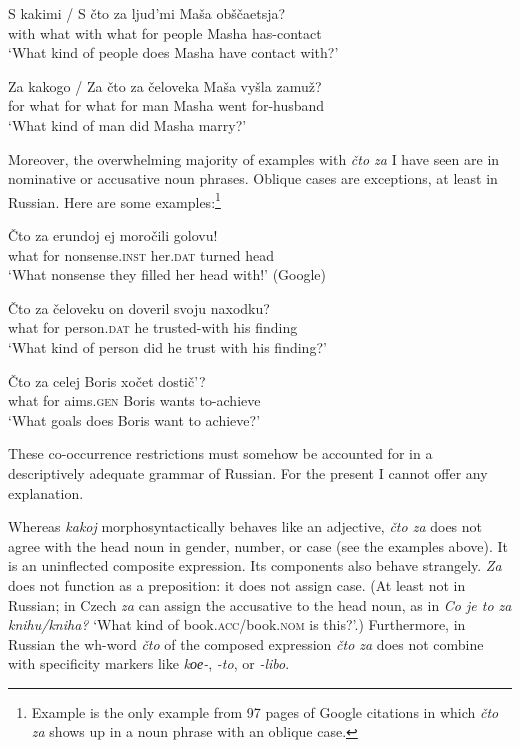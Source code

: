 \documentclass[output=paper,colorlinks,citecolor=brown]{langscibook}
\begin{document}
\ea \label{ex:zi08:10}
    \gll S kakimi / \minsp{*} S čto za ljud'mi {} Maša obščaetsja?\\
    with what {} {} with what for people {} Masha has-contact\\
    \glt `What kind of people does Masha have contact with?'
\z

\ea \label{ex:zi08:11}
    \gll Za kakogo / \minsp{*} Za čto za čeloveka Maša vyšla zamuž?\\
    for what {} {} for what for man Masha went for-husband\\
    \glt `What kind of man did Masha marry?'
\z

\noindent Moreover, the overwhelming majority of examples with \textit{čto za} I have seen are in nominative or accusative noun phrases. Oblique cases are exceptions, at least in Russian. Here are some examples:\footnote{\label{fn:zi08:3}Example  is the only example from 97 pages of Google citations in which \textit{čto za} shows up in a noun phrase with an oblique case.}

\ea \label{ex:zi08:12}
    \gll Čto za erundoj ej moročili golovu!\\
    what for nonsense.\textsc{inst} her.\textsc{dat} turned head\\
    \glt `What nonsense they filled her head with!'
    \xspace\hfill(Google)%
\z

\ea \label{ex:zi08:13}
    \gll Čto za čeloveku on doveril svoju naxodku?\\
    what for person.\textsc{dat} he trusted-with his finding\\
    \glt `What kind of person did he trust with his finding?'
    \xspace\hfill\citep{Israeli2006}
\z

\ea \label{ex:zi08:14}
    \gll Čto za celej Boris xočet dostič'?\\
    what for aims.\textsc{gen} Boris wants to-achieve\\
    \glt `What goals does Boris want to achieve?'
\z

\noindent These co-occurrence restrictions must somehow be accounted for in a descriptively adequate grammar of Russian. For the present I cannot offer any explanation.

Whereas \textit{kakoj} morphosyntactically behaves like an adjective, \textit{čto za} does not agree with the head noun in gender, number, or case (see the examples above). It is an uninflected composite expression. Its components also behave strangely. \textit{Za} does not function as a preposition: it does not assign case. (At least not in Russian; in Czech \textit{za} can assign the accusative to the head noun, as in \textit{Co je to za knihu/kniha?} `What kind of book.\textsc{acc}/book.\textsc{nom} is this?'.) Furthermore, in Russian the wh-word \textit{čto} of the composed expression \textit{čto za} does not combine with specificity markers like \textit{kое-}, \textit{-to}, or \textit{-libo}.
\end{document}

